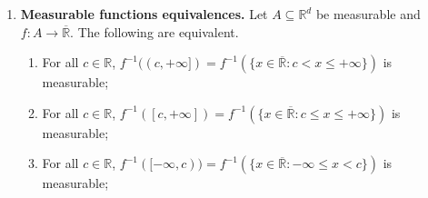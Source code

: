 \begin{enumerate}
\begin{proof}
\begin{enumerate}
		
	\end{enumerate}
Let \( \mathcal{O} \subseteq \mathbb{R} \) be open. Then there exists a sequence \( (I_k) \) of mutually disjoint open intervals in \( \mathbb{R} \) such that \( \mathcal{O} = \bigcup_{k=1}^{\infty} I_k. \) Then \( f^{-1}(\mathcal{O}) = f^{-1}(\bigcup_{k=1}^{\infty} I_k) = \bigcup_{k=1}^{\infty} f^{-1}(I_k)    \). It remains to be shown that the preimage of each \( I_k \) is measurable. Let \( a_k , b_k \in \overline{\mathbb{R}} \) be such that \( I_k = (a_k , b_k) \) for some \( k \geq 1 \). We have two cases.
\begin{enumerate}
	\item If \( -\infty < a_k < b_k < \infty \), then \( f^{-1}(a_k, \infty] \cap [-\infty, b_k)) = f^{-1}((a_k, \infty]) \cap f^{-1}([-\infty, b_k))    \) is measurable.
	\item If \( a_k = -\infty \) and \( b_k < \infty \), then \( f^{-1}((a_k, b_k)) = f^{-1}((-\infty, b_k)) = f^{-1}(\bigcup_{k=1}^{\infty} (-k,b_k)) = \bigcup_{k=1}^{\infty} f^{-1}((-k, b_k))    \) is measurable.
	\item If \( b_k = \infty \) and \( a_k > -\infty \), then \( f^{-1}((a_k, b_k)) = f^{-1}((a_k, \infty)) = f^{-1}(\bigcup_{k=1}^{\infty} (a_k, k)) = \bigcup_{k=1}^{\infty} f^{-1}(a_k, k)     \) and then use (1).
	\item If \( a_k = - \infty \) and \( b_k = \infty \), then \( f^{-1}((-\infty, \infty))  = f^{-1}(\mathbb{R})  \) is measurable by (1).	
\end{enumerate}
In all cases, by using the measurability by countable unions and intersections we obtain that \( f^{-1} (I_k) \) is measurable. Thus, \( \Omega \) is a \(\sigma\)-algebra containing the open sets and hence the Borel sets.
\end{proof}
\item \textbf{Measurable functions equivalences.} Let \( A \subseteq \mathbb{R}^{d}  \) be measurable and \( f: A \to \overline{\mathbb{R}} \). The following are equivalent. 
\begin{enumerate}
	\item For all \( c \in \mathbb{R} \), \( f^{-1}((c, + \infty]) = f^{-1}(\{ x \in \overline{\mathbb{R}} : c < x \leq + \infty \} )   \) is measurable;
	\item For all \( c \in \mathbb{R} \), \( f^{-1}([c, + \infty]) = f^{-1}(\{ x \in \overline{\mathbb{R}} : c \leq x \leq + \infty \} )   \) is measurable;
	\item For all \( c \in \mathbb{R} \), \( f^{-1}([-\infty, c)) = f^{-1}(\{ x \in \overline{\mathbb{R}} : - \infty \leq x < c \} )   \) is measurable;

\end{enumerate}
\end{enumerate}
